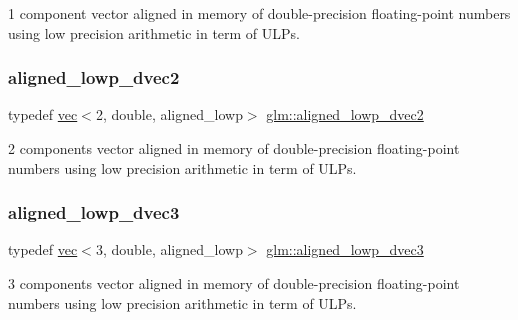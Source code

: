 1 component vector aligned in memory of double-\/precision floating-\/point numbers using low precision arithmetic in term of U\+L\+Ps. 

\mbox{\label{group__gtc__type__aligned_ga82d3a1058d43fa4547f56e8d5c7fb5ca}} 
\subsubsection{\texorpdfstring{aligned\+\_\+lowp\+\_\+dvec2}{aligned\_lowp\_dvec2}}
{\footnotesize\ttfamily typedef \mbox{\hyperlink{structglm_1_1vec}{vec}}$<$2, double, aligned\+\_\+lowp$>$ \mbox{\hyperlink{group__gtc__type__aligned_ga82d3a1058d43fa4547f56e8d5c7fb5ca}{glm\+::aligned\+\_\+lowp\+\_\+dvec2}}}



2 components vector aligned in memory of double-\/precision floating-\/point numbers using low precision arithmetic in term of U\+L\+Ps. 

\mbox{\label{group__gtc__type__aligned_gab8af6a04a9e5c763725913b11df3cec0}} 
\subsubsection{\texorpdfstring{aligned\+\_\+lowp\+\_\+dvec3}{aligned\_lowp\_dvec3}}
{\footnotesize\ttfamily typedef \mbox{\hyperlink{structglm_1_1vec}{vec}}$<$3, double, aligned\+\_\+lowp$>$ \mbox{\hyperlink{group__gtc__type__aligned_gab8af6a04a9e5c763725913b11df3cec0}{glm\+::aligned\+\_\+lowp\+\_\+dvec3}}}



3 components vector aligned in memory of double-\/precision floating-\/point numbers using low precision arithmetic in term of U\+L\+Ps. 

\mbox{\label{group__gtc__type__aligned_ga0c40d2f75a8bdae67116c4c973252baf}} 
